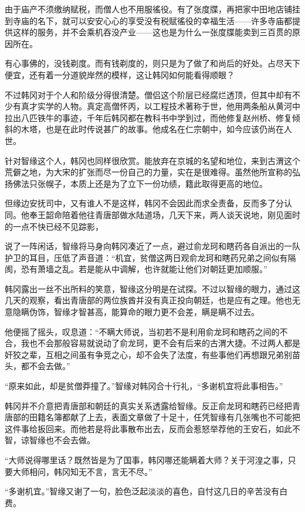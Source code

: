 由于庙产不须缴纳赋税，而僧人也不用服徭役。有了张度牒，再把家中田地店铺挂到寺庙的名下，就可以安安心心的享受没有税赋徭役的幸福生活——许多寺庙都提供这样的服务，并不会乘机吞没产业——这也是为什么一张度牒能卖到三百贯的原因所在。

有心事佛的，没钱剃度。而有钱剃度的，则只是为了做了和尚后的好处。占尽天下便宜，还有着一分道貌岸然的模样，这让韩冈如何能看得顺眼？

不过韩冈对于个人和阶级分得很清楚。僧侣这个阶层已经腐烂透顶，但其中却有不少有真才实学的人物。真定高僧怀丙，以工程技术著称于世，他用两条船从黄河中拉出八匹铁牛的事迹，千年后韩冈都在教科书中学到过，而他修复赵州桥、修复倾斜的木塔，也是在此时传说甚广的故事。他成名在仁宗朝中，如今应该仍尚在人世。

针对智缘这个人，韩冈也同样很欣赏。能放弃在京城的名望和地位，来到古渭这个荒僻之地，为大宋的扩张而尽一份自己的力量，实在是很难得。虽然他所宣称的弘扬佛法只张幌子，本质上还是为了立下一份功绩，籍此取得更高的地位。

但缘边安抚司中，又有谁人不是这样，韩冈不会因此而求全责备，反而多了分认同。他奉王韶命陪着他往青唐部做水陆道场，几天下来，两人谈天说地，刚见面时的一点不快已经不见踪影，

说了一阵闲话，智缘将马身向韩冈凑近了一点，避过俞龙珂和瞎药各自派出的一队护卫的耳目，压低了声音道：“机宜，贫僧这两日观俞龙珂和瞎药兄弟之间似有隔阂，恐有萧墙之乱。若是能从中调解，也许就能让他们对朝廷更加顺服。”

韩冈露出一丝不出所料的笑意，智缘这分明是在试探。不过以智缘的眼力，通过这几天的观察，看出青唐部的两位族酋并没有真正投向朝廷，也是应有之理。他也无意隐瞒伪饰，智缘才智甚高，能算命的眼力更不会差，瞒是瞒不过去。

他便摇了摇头，叹息道：“不瞒大师说，当初若不是利用俞龙珂和瞎药之间的不合，我也不会那般容易就说动了俞龙珂，更不会有后来的古渭大捷。不过两人都是奸狡之辈，互相之间虽有争竞之心，却不会失了法度，有些事他们再想跟兄弟别苗头，都不会去做。”

“原来如此，却是贫僧莽撞了。”智缘对韩冈合十行礼，“多谢机宜将此事相告。”

韩冈并不介意把青唐部和朝廷的真实关系透露给智缘。反正俞龙珂和瞎药已经把青唐部的田籍名簿都献了上去，表面文章做了十足十，任凭智缘有几张嘴也不可能把这件事给扳回来。而他若是将此事散布出去，反而会惹怒举荐他的王安石，如此不智，谅智缘也不会去做。

“大师说得哪里话？既然皆是为了国事，韩冈哪还能瞒着大师？关于河湟之事，只要大师相问，韩冈知无不言，言无不尽。”

“多谢机宜。”智缘又谢了一句，脸色泛起淡淡的喜色，自忖这几日的辛苦没有白费。

